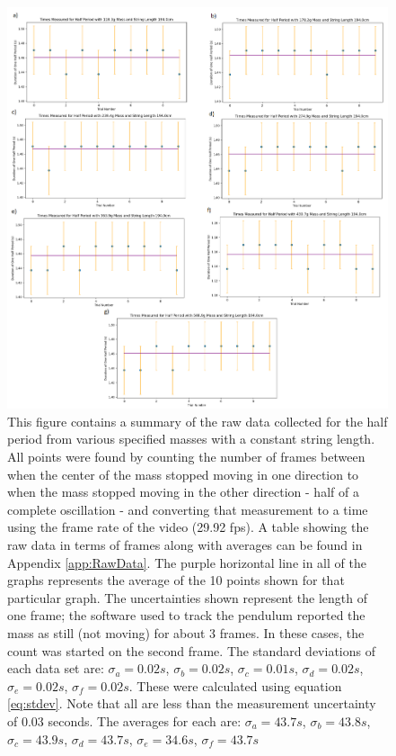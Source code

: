 \documentclass[11pt]{article}
\begin{document}
        \begin{figure}[H]
            \includegraphics[width = \textwidth]{AllRawMassTimes.PNG}
            \caption{This figure contains a summary of the raw data collected for the half period from various specified masses with a  constant string length. All points were found by counting the number of frames between when the center of the mass stopped moving in one direction to when the mass stopped moving in the other direction - half of a complete oscillation - and converting that measurement to a time using the frame rate of the video (29.92 fps). A table showing the raw data in terms of frames along with averages can be found in Appendix \ref{app:RawData}. The purple horizontal line in all of the graphs represents the average of the 10 points shown for that particular graph. The uncertainties shown represent the length of one frame; the software used to track the pendulum reported the mass as still (not moving) for about 3 frames. In these cases, the count was started on the second frame. The standard deviations of each data set are: $\sigma_a = 0.02s$, $\sigma_b = 0.02s$, $\sigma_c = 0.01s$, $\sigma_d = 0.02s$, $\sigma_e = 0.02s$, $\sigma_f = 0.02s$. These were calculated using equation \ref{eq:stdev}. Note that all are less than the measurement uncertainty of 0.03 seconds. The averages for each are: $\sigma_a = 43.7s$, $\sigma_b = 43.8s$, $\sigma_c = 43.9s$, $\sigma_d = 43.7s$, $\sigma_e = 34.6s$, $\sigma_f = 43.7s$}
            \label{fig:RawMassData}
        \end{figure}
\end{document}
